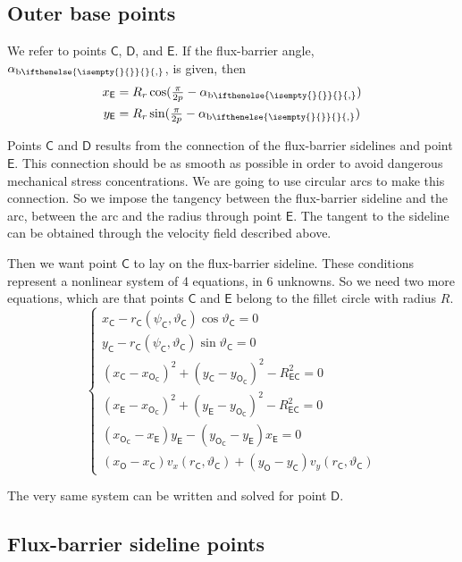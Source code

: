 \documentclass[b5paper,11pt,oneside,fleqn]{article}
\newcommand{\pt}[1]{\mathsf{#1}}
\newcommand{\te}{\vartheta}
\newcommand{\ab}[1][]{%
\alpha_{\textup{b}
\ifthenelse{\isempty{#1}{}}{}{,#1}%
}}
\newcommand{\pih}[1][]{\tfrac{\pi}{2#1}}
\begin{document}
\subsection{Outer base points}
We refer to points $ \pt{C} $, $ \pt{D} $, and $ \pt{E} $.
If the flux-barrier angle, $ \ab $, is given, then
\begin{equation}
\begin{aligned}
x_\pt{E} &= R_r \cos(\pih[p] - \ab) \\
y_\pt{E} &= R_r \sin(\pih[p] - \ab)
\end{aligned}
\end{equation}

Points $ \pt{C} $ and $ \pt{D} $ results from the connection of the
flux-barrier sidelines and point $ \pt{E} $.
This connection should be as smooth as possible in order to
avoid dangerous mechanical stress concentrations.
We are going to use circular arcs to make this connection.
So we impose the tangency between the flux-barrier sideline and the arc,
between the arc and the radius through point $ \pt{E} $.
The tangent to the sideline can be obtained through the velocity field
described above.

Then we want point $ \pt{C} $ to lay on the flux-barrier sideline. These
conditions represent a nonlinear system of 4 equations, in 6 unknowns.
So we need two more equations, which are that points $ \pt{C} $ and $ \pt{E} $
belong to the fillet circle with radius $ R $.
\begin{equation}
\begin{cases}
x_\pt{C} - r_\pt{C}(\psi_\pt{C}, \te_\pt{C}) \cos\te_\pt{C} = 0 \\
y_\pt{C} - r_\pt{C}(\psi_\pt{C}, \te_\pt{C}) \sin\te_\pt{C} = 0 \\
%
(x_\pt{C} - x_\pt{O_\pt{C}})^2 + (y_\pt{C} - y_\pt{O_\pt{C}})^2
- R_\pt{EC}^2 = 0 \\
(x_\pt{E} - x_\pt{O_\pt{C}})^2 + (y_\pt{E} - y_\pt{O_\pt{C}})^2
- R_\pt{EC}^2 = 0 \\
%
(x_\pt{O_\pt{C}} - x_\pt{E}) y_\pt{E} -
(y_\pt{O_\pt{C}} - y_\pt{E}) x_\pt{E} = 0 \\
%
(x_\pt{O} - x_\pt{C}) v_x(r_\pt{C},\te_\pt{C}) +
(y_\pt{O} - y_\pt{C}) v_y(r_\pt{C},\te_\pt{C})
\end{cases}
\end{equation}

The very same system can be written and solved for point $ \pt{D} $.



\subsection{Flux-barrier sideline points}
\end{document}
